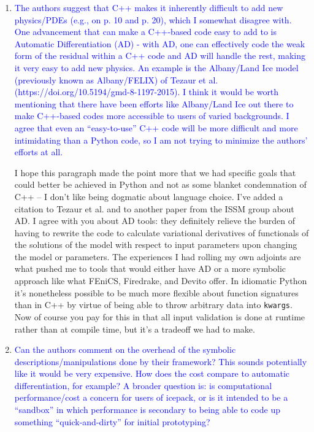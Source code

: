\documentclass{article}
\theoremstyle{definition}
\theoremstyle{plain}
\begin{document}
\begin{enumerate}
\item \textcolor{blue}{The authors suggest that C++ makes it inherently difficult to add new physics/PDEs (e.g., on p. 10
and p. 20), which I somewhat disagree with. One advancement that can make a C++-based code
easy to add to is Automatic Differentiation (AD) - with AD, one can effectively code the weak form
of the residual within a C++ code and AD will handle the rest, making it very easy to add new
physics. An example is the Albany/Land Ice model (previously known as Albany/FELIX) of Tezaur
et al. (https://doi.org/10.5194/gmd-8-1197-2015). I think it would be worth mentioning that
there have been efforts like Albany/Land Ice out there to make C++-based codes more accessible to
users of varied backgrounds. I agree that even an ``easy-to-use'' C++ code will be more difficult and
more intimidating than a Python code, so I am not trying to minimize the authors' efforts at all.}

I hope this paragraph made the point more that we had specific goals that could better be achieved in Python and not as some blanket condemnation of C++ -- I don't like being dogmatic about language choice.
I've added a citation to Tezaur et al. and to another paper from the ISSM group about AD.
I agree with you about AD tools: they definitely relieve the burden of having to rewrite the code to calculate variational derivatives of functionals of the solutions of the model with respect to input parameters upon changing the model or parameters.
The experiences I had rolling my own adjoints are what pushed me to tools that would either have AD or a more symbolic approach like what FEniCS, Firedrake, and Devito offer.
In idiomatic Python it's nonetheless possible to be much more flexible about function signatures than in C++ by virtue of being able to throw arbitrary data into \texttt{kwargs}.
Now of course you pay for this in that all input validation is done at runtime rather than at compile time, but it's a tradeoff we had to make.

\item \textcolor{blue}{Can the authors comment on the overhead of the symbolic descriptions/manipulations done by their
framework? This sounds potentially like it would be very expensive. How does the cost compare to
automatic differentiation, for example? A broader question is: is computational performance/cost a
concern for users of icepack, or is it intended to be a ``sandbox'' in which performance is secondary
to being able to code up something ``quick-and-dirty'' for initial prototyping?}


\end{enumerate}
\end{document}
